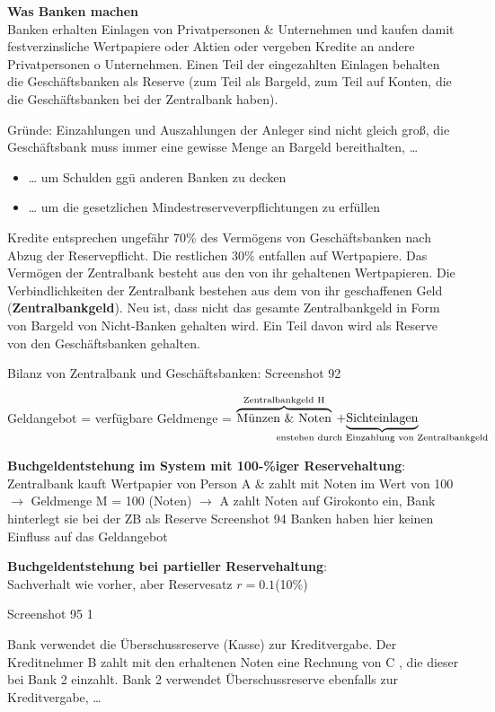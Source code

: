 \documentclass[11pt]{article}
\begin{document}
\textbf{Was Banken machen}\\
Banken erhalten Einlagen von Privatpersonen \& Unternehmen und kaufen damit festverzinsliche Wertpapiere oder Aktien oder vergeben Kredite an andere Privatpersonen o Unternehmen. Einen Teil der eingezahlten Einlagen behalten die Geschäftsbanken als Reserve (zum Teil als Bargeld, zum Teil auf Konten, die die Geschäftsbanken bei der Zentralbank haben).

Gründe: Einzahlungen und Auszahlungen der Anleger sind nicht gleich groß, die Geschäftsbank muss immer eine gewisse Menge an Bargeld bereithalten, \ldots{}
\begin{itemize}
\item \ldots{} um Schulden ggü anderen Banken zu decken
\item \ldots{} um die gesetzlichen Mindestreserveverpflichtungen zu erfüllen
\end{itemize}

Kredite entsprechen ungefähr 70\% des Vermögens von Geschäftsbanken nach Abzug der Reservepflicht. Die restlichen 30\% entfallen auf Wertpapiere.
Das Vermögen der Zentralbank besteht aus den von ihr gehaltenen Wertpapieren. Die Verbindlichkeiten der Zentralbank bestehen aus dem von ihr geschaffenen Geld (\textbf{Zentralbankgeld}). Neu ist, dass nicht das gesamte Zentralbankgeld in Form von Bargeld von Nicht-Banken gehalten wird. Ein Teil davon wird als Reserve von den Geschäftsbanken gehalten.

Bilanz von Zentralbank und Geschäftsbanken:
Screenshot 92

Geldangebot = verfügbare Geldmenge = \({\overbrace{\textstyle \text{Münzen \& Noten}}^{\mathclap{\text{ Zentralbankgeld H }}}}\) \(+ {\underbrace{\textstyle \text{Sichteinlagen}}_{\mathclap{\text{enstehen durch Einzahlung von Zentralbankgeld}}}}\)

\textbf{Buchgeldentstehung im System mit 100-\%iger Reservehaltung}:\\
Zentralbank kauft Wertpapier von Person A \& zahlt mit Noten im Wert von 100 \(\rightarrow\) Geldmenge M = 100 (Noten) \(\rightarrow\) A zahlt Noten auf Girokonto ein, Bank hinterlegt sie bei der ZB als Reserve
Screenshot 94
Banken haben hier keinen Einfluss auf das Geldangebot

\textbf{Buchgeldentstehung bei partieller Reservehaltung}:\\
Sachverhalt wie vorher, aber Reservesatz \(r=0.1\)(10\%)

Screenshot 95 1

Bank verwendet die Überschussreserve (Kasse) zur Kreditvergabe. Der Kreditnehmer B zahlt mit den erhaltenen
Noten eine Rechnung von C , die dieser bei Bank 2 einzahlt. Bank 2 verwendet Überschussreserve ebenfalls zur
Kreditvergabe, \ldots{}
\end{document}
